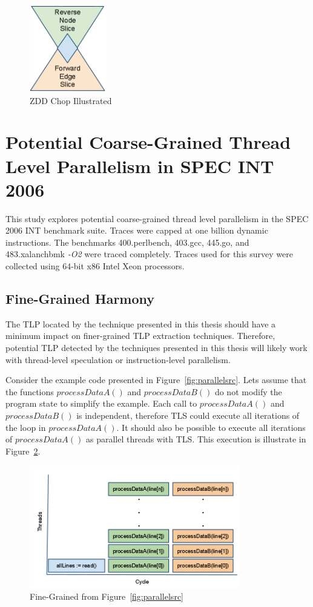 \documentclass[defaultstyle,11pt]{thesis}
\begin{document}
\begin{figure}
  \centering
  \includegraphics[height=1.5in]{images/choppic}
  \caption{ZDD Chop Illustrated}
  \label{fig:choppic}
\end{figure}

\section{Potential Coarse-Grained Thread Level Parallelism in SPEC INT 2006}
\label{sec:tlpstudy}

This study explores potential coarse-grained thread level parallelism
in the SPEC 2006 INT benchmark suite.  Traces were capped at one
billion dynamic instructions.  The benchmarks 400.perlbench, 403.gcc,
445.go, and 483.xalanchbmk \textit{-O2} were traced completely. Traces
used for this survey were collected using 64-bit x86 Intel Xeon
processors.

\subsection{Fine-Grained Harmony}

The TLP located by the technique presented in this thesis should have a
minimum impact on finer-grained TLP extraction techniques. Therefore,
potential TLP detected by the techniques presented in this thesis will
likely work  with thread-level speculation or
instruction-level parallelism.

Consider the example code presented in
Figure~\ref{fig:parallelsrc}. Lets assume that the functions
$processDataA()$ and $processDataB()$ do not modify the program state
to simplify the example. Each call to $processDataA()$ and
$processDataB()$ is independent, therefore TLS could execute all
iterations of the loop in $processDataA()$.  It should also be
possible to execute all iterations of $processDataA()$ as parallel
threads with TLS.  This execution is illustrate in
Figure~\ref{fig:illistFineGrained}.

\begin{figure}
  \centering
 \includegraphics[height=2.10in]{images/fine_grained_tlp}
  \caption{Fine-Grained from Figure~\ref{fig:parallelsrc}}
  \label{fig:illistFineGrained}
\end{figure}
\end{document}
